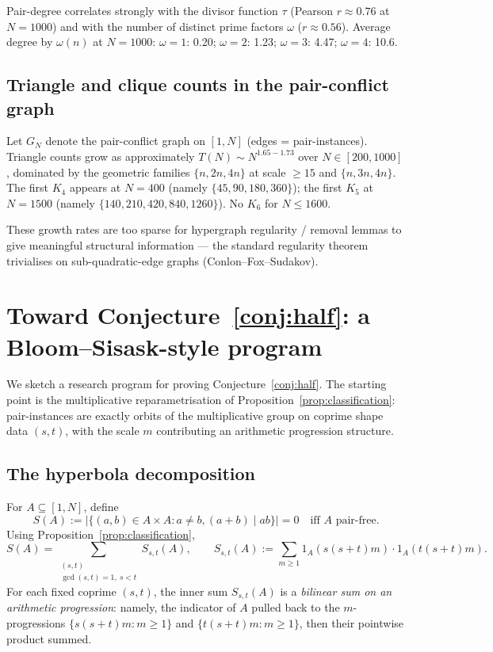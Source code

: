 \documentclass[11pt]{amsart}
\theoremstyle{plain}
\theoremstyle{definition}
\begin{document}
Pair-degree correlates strongly with the divisor function $\tau$ (Pearson $r \approx 0.76$ at $N = 1000$) and with the number of distinct prime factors $\omega$ ($r \approx 0.56$). Average degree by $\omega(n)$ at $N = 1000$: $\omega = 1$: 0.20; $\omega = 2$: 1.23; $\omega = 3$: 4.47; $\omega = 4$: 10.6.

\subsection{Triangle and clique counts in the pair-conflict graph}

Let $G_N$ denote the pair-conflict graph on $[1, N]$ (edges = pair-instances). Triangle counts grow as approximately $T(N) \sim N^{1.65 - 1.73}$ over $N \in [200, 1000]$, dominated by the geometric families $\{n, 2n, 4n\}$ at scale $\geq 15$ and $\{n, 3n, 4n\}$. The first $K_4$ appears at $N = 400$ (namely $\{45, 90, 180, 360\}$); the first $K_5$ at $N = 1500$ (namely $\{140, 210, 420, 840, 1260\}$). No $K_6$ for $N \leq 1600$.

These growth rates are too sparse for hypergraph regularity / removal lemmas to give meaningful structural information --- the standard regularity theorem trivialises on sub-quadratic-edge graphs (Conlon--Fox--Sudakov).

\section{Toward Conjecture~\ref{conj:half}: a Bloom--Sisask-style program}\label{sec:bloom-sisask}

We sketch a research program for proving Conjecture~\ref{conj:half}. The starting point is the multiplicative reparametrisation of Proposition~\ref{prop:classification}: pair-instances are exactly orbits of the multiplicative group on coprime shape data $(s, t)$, with the scale $m$ contributing an arithmetic progression structure.

\subsection{The hyperbola decomposition}

For $A \subseteq [1, N]$, define
\[
  S(A) := |\{(a, b) \in A \times A : a \neq b, (a + b) \mid ab\}| = 0 \quad \text{iff } A \text{ pair-free}.
\]
Using Proposition~\ref{prop:classification},
\[
  S(A) = \sum_{\substack{(s, t) \\ \gcd(s,t) = 1, \ s < t}} S_{s,t}(A), \qquad S_{s,t}(A) := \sum_{m \geq 1} 1_A(s(s+t)m) \cdot 1_A(t(s+t)m).
\]
For each fixed coprime $(s, t)$, the inner sum $S_{s,t}(A)$ is a \emph{bilinear sum on an arithmetic progression}: namely, the indicator of $A$ pulled back to the $m$-progressions $\{s(s+t) m : m \geq 1\}$ and $\{t(s+t) m : m \geq 1\}$, then their pointwise product summed.
\end{document}
